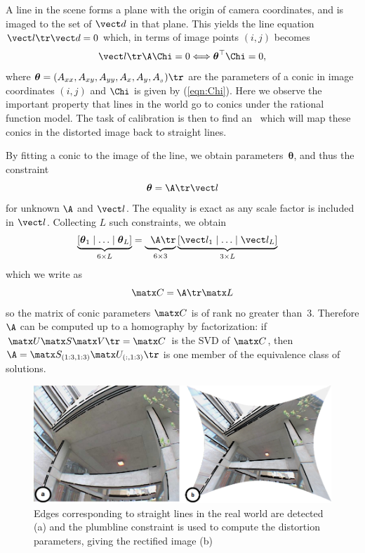 \documentclass[extendedabs]{bmvc2k}
\begin{document}
\def\conic{{\boldsymbol\theta}}
A line in the scene forms a plane with the origin of camera
coordinates, and is imaged to the set of $\vect d$ in that plane.
This yields the line equation $\vect l\tr \vect d = 0$ which, in
terms of image points $(i,j)$ becomes
\begin{equation}
\vect l\tr \A \Chi = 0 \Longleftrightarrow \conic^{\top} \Chi = 0,
\end{equation}
where $\conic = (A_{xx}, A_{xy}, A_{yy}, A_x, A_y,
A_{_\mathit{0}})\tr$ are the parameters of a conic in image coordinates $(i,j)$
and $\Chi$ is given by (\ref{eqn:Chi}).  Here we observe the
important property that lines in the world go to conics under the
rational function model.  The task of calibration is then to find an
\A\ which will map these conics in the distorted image back to
straight lines.

By fitting a conic to the image of the line, we obtain
parameters~$\conic$, and thus the constraint
\[
\conic = \A\tr \vect l
\]
for unknown $\A$ and $\vect l$.  The equality is exact as any scale
factor is included in $\vect l$. Collecting $L$ such constraints, we
obtain
\begin{align}
\underbrace{\left[ \conic_1 \mid \ldots \mid \conic_L
\right]}_{6\times L} & =
\underbrace{\phantom{\left[\right]}\A\tr}_{6\times 3}
\underbrace{\left[ \vect l_1 \mid \ldots \mid \vect l_L \right]}_{3\times L}
\nonumber
\end{align}
which we write as
\[
\matx C = \A\tr \matx L\label{eqn:proj_line}
\]
so the matrix of conic parameters $\matx C$ is of rank no greater
than~$3$.  Therefore $\A$ can be computed up to a homography by
factorization: if $\matx U \matx S \matx V\tr = \matx C$ is the SVD
of $\matx C$, then $\A = \matx S_{(1:3,1:3)} {\matx U_{(:,1:3)}}\tr$
is one member of the equivalence class of solutions.

\begin{figure}[t]
\includegraphics[width=\linewidth]{images/fig1.png}
\caption{
Edges corresponding to straight lines in the real world are
detected (a) and the plumbline constraint is used to compute the
distortion parameters, giving the rectified image (b)}
\vspace{-2mm}
\end{figure}
\end{document}
